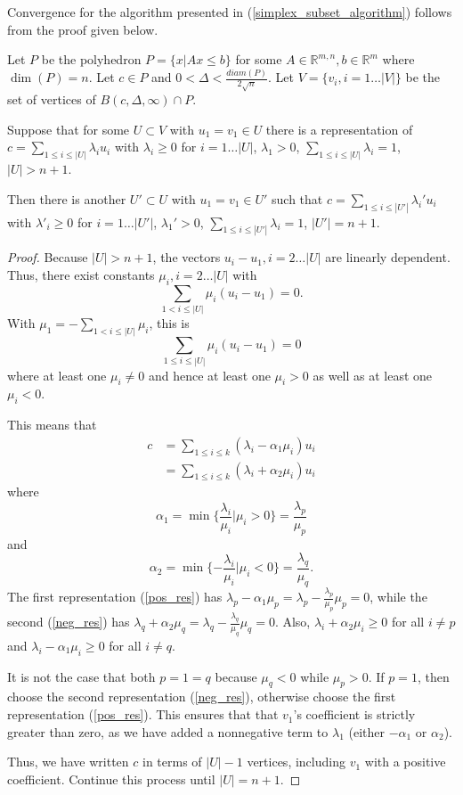\documentclass{article}
\let\oldref\ref
\renewcommand{\ref}[1]{(\oldref{#1})}
\begin{document}
Convergence for the algorithm presented in \ref{simplex_subset_algorithm} follows from the proof given below.

\label{simplexes_exist}


Let $P$ be the polyhedron $P=\{x | Ax \le b\}$ for some $A \in \mathbb R^{m,n}, b \in \mathbb R^{m}$ where $\dim(P) = n$.
Let $c \in P$ and $0 < \Delta < \frac {diam(P)}{2\sqrt{n}}$.
Let $V = \{v_i, i=1\ldots |V|\}$ be the set of vertices of $B(c, \Delta, \infty) \cap P$.

\begin{lemma}
\label{positive_carried}
Suppose that for some $U \subset V$ with $u_1 = v_1 \in U$ there is a representation of 
$c=\sum_{1\le i \le |U|} \lambda_i u_i$ with $\lambda_i \ge 0$ for $i=1\ldots |U|$, $\lambda_1 > 0$, $\sum_{1\le i\le |U|} \lambda_i = 1$, $|U| > n+1$.

Then there is another $U' \subset U$ with $u_1 = v_1 \in U'$ such that
$c=\sum_{1\le i \le |U'|} \lambda_i' u_i$ with $\lambda'_i \ge 0$ for $i=1\ldots |U'|$, $\lambda_1' > 0$, $\sum_{1\le i\le |U'|} \lambda_i = 1$, $|U'| = n+1$.
\end{lemma}

\begin{proof}
Because $|U|>n+1$, the vectors $u_{i} - u_1, i=2\ldots |U|$ are linearly dependent.
Thus, there exist constants $\mu_i,i=2\ldots |U|$ with
\[
\sum_{1 < i \le |U|}\mu_i(u_i - u_1) = 0.
\]
With $\mu_1 = -\sum_{1<i\le|U|}\mu_i$, this is
\[
\sum_{1 \le i \le |U|}\mu_i(u_i - u_1) = 0
\]
 where at least one $\mu_i \ne 0$ and hence at least one $\mu_i > 0$ as well as at least one $\mu_i < 0$.

This means that 
\begin{align}
c &= \sum_{1\le i \le k }(\lambda_i - \alpha_1\mu_i)u_i \label{pos_res} \\
  &= \sum_{1\le i \le k }(\lambda_i + \alpha_2\mu_i)u_i \label{neg_res}
\end{align}
where 
\[\alpha_1 = \min\{ \frac{\lambda_i}{\mu_i}|\mu_i > 0\} = \frac{\lambda_p}{\mu_p}\] and 
\[\alpha_2 = \min\{-\frac{\lambda_i}{\mu_i}|\mu_i < 0\}= \frac{\lambda_q}{\mu_q}.\]
The first representation \ref{pos_res} has $\lambda_p - \alpha_1\mu_p = \lambda_p - \frac{\lambda_p}{\mu_p}\mu_p = 0$,
while the second \ref{neg_res} has
$\lambda_q + \alpha_2\mu_q = \lambda_q - \frac{\lambda_q}{\mu_q}\mu_q = 0$.
Also, 
$\lambda_i + \alpha_2\mu_i \ge 0$ for all $i\ne p$ and $\lambda_i - \alpha_1\mu_i \ge 0$ for all $i\ne q$.

It is not the case that both $p=1=q$ because $\mu_q < 0$ while $\mu_p > 0$.
If $p=1$, then choose the second representation \ref{neg_res}, otherwise choose the first representation \ref{pos_res}.
This ensures that that $v_1$'s coefficient is strictly greater than zero, as we have added a nonnegative term to $\lambda_1$ (either $-\alpha_1$ or $\alpha_2$).

Thus, we have written $c$ in terms of $|U|-1$ vertices, including $v_1$ with a positive coefficient.
Continue this process until $|U| = n+1$.

\end{proof}
\end{document}
